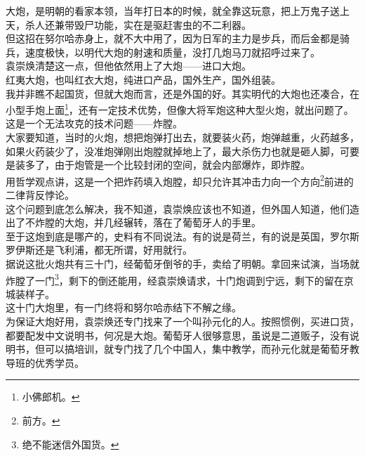 \begin{multicols}{\theparacolNo}
大炮，是明朝的看家本领，当年打日本的时候，就全靠这玩意，把上万鬼子送上天，杀人还兼带毁尸功能，实在是驱赶害虫的不二利器。\\

但这招在努尔哈赤身上，就不大中用了，因为日军的主力是步兵，而后金都是骑兵，速度极快，以明代大炮的射速和质量，没打几炮马刀就招呼过来了。\\

袁崇焕清楚这一点，但他依然用上了大炮——进口大炮。\\

红夷大炮，也叫红衣大炮，纯进口产品，国外生产，国外组装。\\

我并非瞧不起国货，但就大炮而言，还是外国的好。其实明代的大炮也还凑合，在小型手炮上面\footnote{小佛郎机。}，还有一定技术优势，但像大将军炮这种大型火炮，就出问题了。\\

这是一个无法攻克的技术问题——炸膛。\\

大家要知道，当时的火炮，想把炮弹打出去，就要装火药，炮弹越重，火药越多，如果火药装少了，没准炮弹刚出炮膛就掉地上了，最大杀伤力也就是砸人脚，可要是装多了，由于炮管是一个比较封闭的空间，就会内部爆炸，即炸膛。\\

用哲学观点讲，这是一个把炸药填入炮膛，却只允许其冲击力向一个方向\footnote{前方。}前进的二律背反悖论。\\

这个问题到底怎么解决，我不知道，袁崇焕应该也不知道，但外国人知道，他们造出了不炸膛的大炮，并几经辗转，落在了葡萄牙人的手里。\\

至于这炮到底是哪产的，史料有不同说法。有的说是荷兰，有的说是英国，罗尔斯罗伊斯还是飞利浦，都无所谓，好用就行。\\

据说这批火炮共有三十门，经葡萄牙倒爷的手，卖给了明朝。拿回来试演，当场就炸膛了一门\footnote{绝不能迷信外国货。}，剩下的倒还能用，经袁崇焕请求，十门炮调到宁远，剩下的留在京城装样子。\\

这十门大炮里，有一门终将和努尔哈赤结下不解之缘。\\

为保证大炮好用，袁崇焕还专门找来了一个叫孙元化的人。按照惯例，买进口货，都要配发中文说明书，何况是大炮。葡萄牙人很够意思，虽说是二道贩子，没有说明书，但可以搞培训，就专门找了几个中国人，集中教学，而孙元化就是葡萄牙教导班的优秀学员。\\


\end{multicols}

